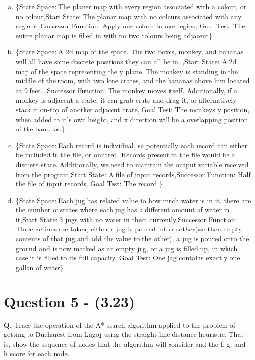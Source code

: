 \documentclass[12pt]{amsart}
\begin{document}
\begin{enumerate}[a)]
\item \{State Space: The planer map with every region associated with a colour, or no colour,Start State: The planar map with no colours associated with any regions ,Successor Function: Apply one colour to one region, Goal Test:  The entire planar map is filled in with no two colours being adjacent\}
\item \{State Space: A 2d map of the space. The two boxes, monkey, and bananas will all have some discrete positions they can all be in. ,Start State: A 2d map of the space representing the y plane. The monkey is standing in the middle of the room, with two lone crates, and the bananas above him located at 9 feet. ,Successor Function: The monkey moves itself. Additionally, if a monkey is adjacent a crate, it can grab crate and drag it, or alternatively stack it on-top of another adjacent crate, Goal Test:  The monkeys y position, when added to it's own height, and x direction will be a overlapping position of the bananas.\}
\item \{State Space: Each record is individual, so potentially each record can either be included in the file, or omitted. Records present in the file would be a discrete state. Additionally, we need to maintain the output variable received from the program,Start State: A file of input records,Successor Function: Half the file of input records, Goal Test:  The record \}
\item \{State Space: Each jug has related value to how much water is in it, there are the number of states where each jug has a different amount of water in it,Start State: 3 jugs with no water in them currently,Successor Function: Three actions are taken, either a jug is poured into another(we then empty contents of that jug and add the value to the other), a jug is poured onto the ground and is now marked as an empty jug, or a jug is filled up, in which case it is filled to its full capacity, Goal Test: One jug contains exactly one gallon of water\}
\end{enumerate} \hfill \break

\section*{Question 5 - (3.23)}
\textbf{Q.} Trace the operation of the A* search algorithm applied to the problem of getting to Bucharest from Lugoj using the straight-line distance heuristic. That is, show the sequence of nodes that the algorithm will consider and the f, g, and h score for each node.    \hfill \break
\end{document}
